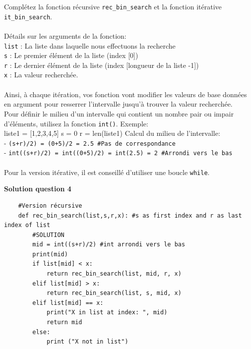 \begin{Exercice}[20 minutes]
    \begin{conseil}
        Complétez la fonction récursive \lstinline{rec_bin_search} et la fonction itérative \lstinline{it_bin_search}.\\\\
        Détails sur les arguments de la fonction:\\
        \lstinline{list} : La liste dans laquelle nous effectuons la recherche\\
        \lstinline{s} : Le premier élément de la liste (index [0])\\
        \lstinline{r} : Le dernier élément de la liste (index [longueur de la liste -1])\\
        \lstinline{x} : La valeur recherchée.\\\\

        Ainsi, à chaque itération, vos fonction vont modifier les valeurs de base données en argument pour resserrer l'intervalle jusqu'à trouver la valeur recherchée.\\        
        Pour définir le milieu d'un intervalle qui contient un nombre pair ou impair d'éléments, utilisez la fonction \lstinline{int()}. Exemple:\\
        liste1 = [1,2,3,4,5]
        s = 0 \quad r = len(liste1)
        Calcul du milieu de l'intervalle:\\
        - \lstinline{(s+r)/2) = (0+5)/2 = 2.5 #Pas de correspondance}\\
        - \lstinline{int((s+r)/2) = int((0+5)/2) = int(2.5) = 2 #Arrondi vers le bas}\\\\
        
        Pour la version itérative, il est conseillé d'utiliser une boucle \lstinline{while}.

    \end{conseil}

    \textbf{Solution question 4}

    \begin{verbatim}
    #Version récursive
    def rec_bin_search(list,s,r,x): #s as first index and r as last index of list
        #SOLUTION
        mid = int((s+r)/2) #int arrondi vers le bas
        print(mid)
        if list[mid] < x:
            return rec_bin_search(list, mid, r, x) 
        elif list[mid] > x:
            return rec_bin_search(list, s, mid, x)
        elif list[mid] == x:
            print("X in list at index: ", mid)
            return mid 
        else:
            print ("X not in list")
            

\end{verbatim}
\end{Exercice}
